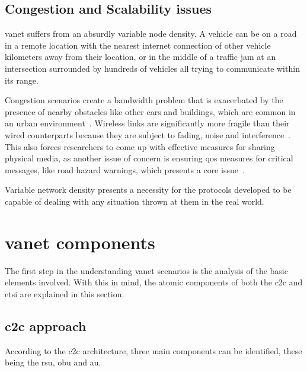 \subsection{Congestion and Scalability issues}
\label{subsec:congestion_scalability}

\gls{vanet} suffers from an absurdly variable node density. A vehicle can be on a road in a remote location with the nearest internet connection of other vehicle kilometers away from their location, or in the middle of a traffic jam at an intersection surrounded by hundreds of vehicles all trying to communicate within its range.

Congestion scenarios create a bandwidth problem that is exacerbated by the presence of nearby obstacles like other cars and buildings, which are common in an urban environment~\cite{toor_vehicle_2008}. Wireless links are significantly more fragile than their wired counterparts because they are subject to fading, noise and interference~\cite{corson_mobile_1999}. This also forces researchers to come up with effective measures for sharing physical media, as another issue of concern is ensuring \gls{qos} measures for critical messages, like road hazard warnings, which presents a core issue~\cite{toor_vehicle_2008}.
 
Variable network density presents a necessity for the protocols developed to be capable of dealing with any situation thrown at them in the real world.


\section[VANET components]{\gls{vanet} components}
\label{sec:VANET_components}

The first step in the understanding \gls{vanet} scenarios is the analysis of the basic elements involved. With this in mind, the atomic components of both the \gls{c2c} and \gls{etsi} are explained in this section.

\subsection[C2C approach]{\gls{c2c} approach}
According to the \gls{c2c} architecture, three main components can be identified, these being the \gls{rsu}, \gls{obu} and \gls{au}.

